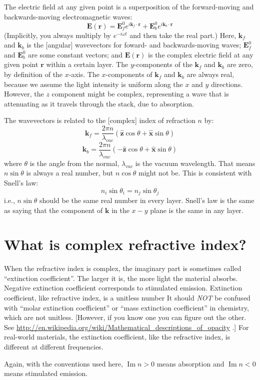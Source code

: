 \documentclass[12pt]{article}
\renewcommand{\(}{\left(}
\renewcommand{\)}{\right)}
\renewcommand{\Im}{\operatorname{Im}}
\newcommand{\E}{\mathbf{E}}
\renewcommand{\k}{\mathbf{k}}
\renewcommand{\r}{\mathbf{r}}
\newcommand{\x}{\hat{\mathbf{x}}}
\newcommand{\z}{\hat{\mathbf{z}}}
\begin{document}
The electric field at any given point is a superposition of the forward-moving and backwards-moving electromagnetic waves:
$$\E(\r) = \E_f^0 e^{i\k_f\cdot\r} + \E_b^0 e^{i\k_b\cdot\r}$$
(Implicitly, you always multiply by $e^{-i\omega t}$ and  then take the real part.) Here, $\k_f$ and $\k_b$ is the [angular] wavevectors for foward- and backwards-moving waves; $\E_f^0$ and $\E_b^0$ are some constant vectors; and $\E(\r)$ is the complex electric field at any given point $\r$ within a certain layer. The $y$-components of the $\k_f$ and $\k_b$ are zero, by definition of the $x$-axis. The $x$-components of $\k_f$ and $\k_b$ are always  real, because we assume the light intensity is uniform along the $x$ and $y$ directions. However, the $z$ component might be complex, representing a wave that is attenuating as it travels through the stack, due to absorption.

The wavevectors is related to the [complex] index of refraction $n$ by:
$$\k_f = \frac{2\pi n}{\lambda_{vac}}(\z \cos \theta + \x \sin \theta)$$
$$\k_b = \frac{2\pi n}{\lambda_{vac}}(-\z \cos \theta + \x \sin \theta)$$
where $\theta$ is the angle from the normal, $\lambda_{vac}$ is the vacuum wavelength. That means $n \sin \theta$ is always a real number, but $n \cos \theta$ might not be. This is consistent with Snell's law:
$$n_i \sin \theta_i = n_j \sin \theta_j$$
i.e., $n\sin \theta$ should be the same real number in every layer. Snell's law is the same as saying that the component of $\k$ in the $x-y$ plane is the same in any layer.

\section{What is complex refractive index?}

When the refractive index is complex, the imaginary part is sometimes called ``extinction coefficient''. The larger it is, the more light the material absorbs. Negative extinction coefficient corresponds to stimulated emission. Extinction coefficient, like refractive index, is a unitless number It should \emph{NOT} be confused with ``molar extinction coefficient'' or ``mass extinction coefficient'' in chemistry, which are not unitless. [However, if you know one you can figure out the other. See \url{http://en.wikipedia.org/wiki/Mathematical_descriptions_of_opacity} .] For real-world materials, the extinction coefficient, like the refractive index, is different at different frequencies.

Again, with the conventions used here, $\Im n>0$ means absorption and $\Im n<0$ means stimulated emission.
\end{document}
